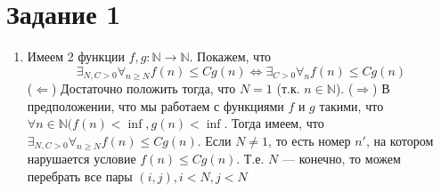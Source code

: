 \documentclass[12pt, a4paper]{article}
\newcommand{\task}[1]{\section*{Задание #1}}
\begin{document}
\task{1}
\begin{enumerate}
	\item Имеем 2 функции $f, g: \mathbb{N} \rightarrow \mathbb{N}$. Покажем, что
	\[ 
	\exists_{N, C > 0}{ \forall_{n \geq N}{ f(n) \leq C g(n) }} \iff \exists_{C > 0}{ \forall_{n}{ f(n) \leq C g(n) }} 
	\]
	($\Leftarrow$) Достаточно положить тогда, что $N = 1$ (т.к. $n \in \mathbb{N}$).
	($\Rightarrow$) В предположении, что мы работаем с функциями $f$ и $g$ такими, что $\forall n \in \mathbb{N} 
	(f(n) < \inf, g(n) < \inf$. Тогда имеем, что $\exists_{N, C > 0}{ \forall_{n \geq N}{ f(n) \leq C g(n) }}$.
	Если $N \neq 1$, то есть номер $n'$, на котором нарушается условие $f(n) \leq Cg(n)$. Т.е. $N$ --- конечно, то
	можем перебрать все пары $(i, j), i < N, j < N$
\end{enumerate}
\end{document}
